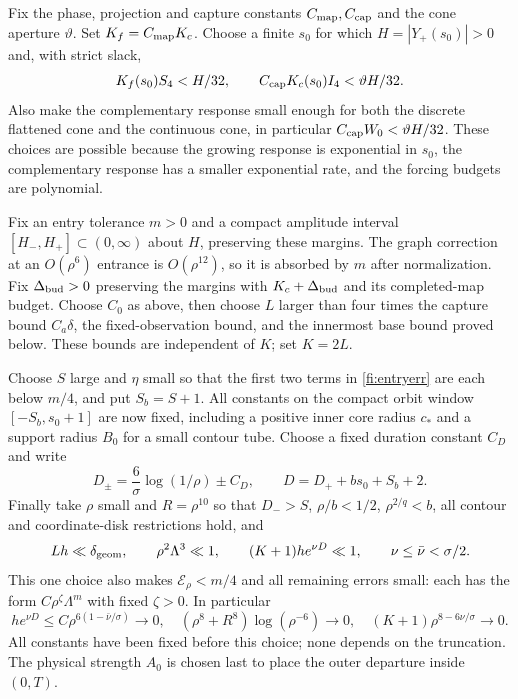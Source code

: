 \documentclass[11pt]{amsart}
\theoremstyle{remark}
\numberwithin{equation}{section}
\begin{document}
Fix the phase, projection and capture constants
$C_{\rm map},C_{\rm cap}$ and the cone aperture $\vartheta$.
Set $K_f=C_{\rm map}K_c$.
Choose a finite $s_0$ for which $H=|Y_+(s_0)|>0$ and, with
strict slack,
\begin{equation}\label{fi:both-forcing-margins}
 K_f(s_0)S_4<H/32,\qquad
 C_{\rm cap}K_c(s_0)I_4<\vartheta H/32 .
\end{equation}
Also make the complementary response small enough for both the
discrete flattened cone and the continuous cone, in particular
$C_{\rm cap}W_0<\vartheta H/32$.
These choices are possible because the growing response is
exponential in $s_0$, the complementary response has a smaller
exponential rate, and the forcing budgets are polynomial.

Fix an entry tolerance $m>0$ and a compact amplitude interval
$[H_-,H_+]\subset(0,\infty)$ about $H$, preserving these margins.
The graph correction at an $O(\rho^6)$ entrance is $O(\rho^{12})$,
so it is absorbed by $m$ after normalization.
Fix $\Delta_{\rm bud}>0$ preserving the margins with
$K_c+\Delta_{\rm bud}$ and its completed-map budget.
Choose $C_0$ as above, then choose $L$ larger than four times the
capture bound $C_a\delta$, the fixed-observation bound, and the
innermost base bound proved below. These bounds are independent
of $K$; set $K=2L$.

Choose $S$ large and $\eta$ small so that the first two terms in
\eqref{fi:entryerr} are each below $m/4$, and put $S_b=S+1$.
All constants on the compact orbit window $[-S_b,s_0+1]$ are now
fixed, including a positive inner core radius $c_*$ and a support
radius $B_0$ for a small contour tube. Choose a fixed duration
constant $C_D$ and write
\[
 D_\pm=\frac6\sigma\log(1/\rho)\pm C_D,\qquad
 D=D_++bs_0+S_b+2 .
\]
Finally take $\rho$ small and $R=\rho^{10}$ so that
$D_->S$, $\rho/b<1/2$, $\rho^{2/q}<b$,
all contour and coordinate-disk restrictions hold, and
\begin{equation}\label{fi:smalllist}
 Lh\ll\delta_{\rm geom},\qquad
 \rho^2\Lambda^3\ll1,\qquad
 (K+1)h e^{\nu D}\ll1,\qquad \nu\le\bar\nu<\sigma/2 .
\end{equation}
This one choice also makes $\mathcal E_\rho<m/4$ and all remaining
errors small: each has the form $C\rho^\zeta\Lambda^m$ with fixed
$\zeta>0$. In particular
\[
 h e^{\nu D}\le C\rho^{6(1-\bar\nu/\sigma)}\to0,\quad
 (\rho^8+R^8)\log(\rho^{-6})\to0,\quad
 (K+1)\rho^{8-6\nu/\sigma}\to0 .
\]
All constants have been fixed before this choice; none depends on
the truncation. The physical strength $A_0$ is chosen last to place
the outer departure inside $(0,T)$.
\end{document}
